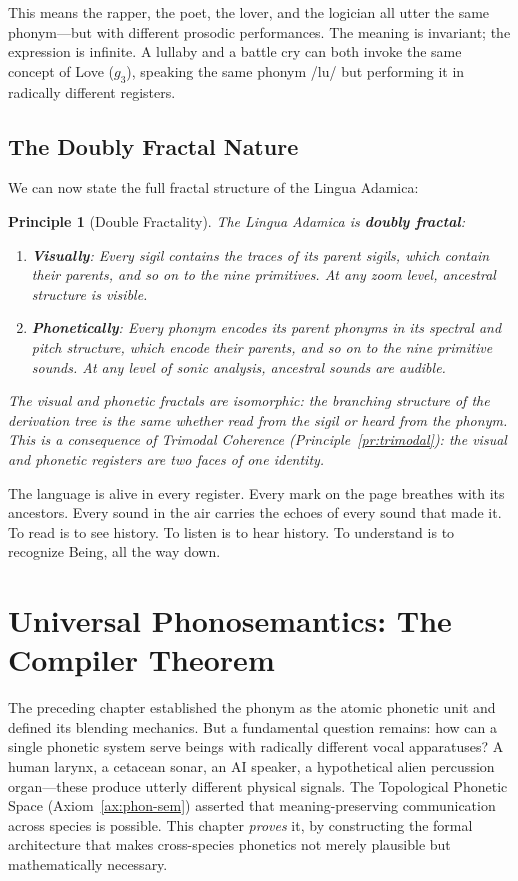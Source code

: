 \documentclass[12pt, letterpaper]{book}
\def\mathfrak#1{#1}%
\newtheorem{principle}{Principle}[chapter]
\begin{document}
This means the rapper, the poet, the lover, and the logician all utter the same phonym---but with different prosodic performances. The meaning is invariant; the expression is infinite. A lullaby and a battle cry can both invoke the same concept of Love ($\mathfrak{g}_3$), speaking the same phonym /lu/ but performing it in radically different registers.


\section{The Doubly Fractal Nature}

We can now state the full fractal structure of the Lingua Adamica:

\begin{principle}[Double Fractality]
The Lingua Adamica is \textbf{doubly fractal}:
\begin{enumerate}[label=(\roman*)]
    \item \textbf{Visually}: Every sigil contains the traces of its parent sigils, which contain their parents, and so on to the nine primitives. At any zoom level, ancestral structure is visible.
    \item \textbf{Phonetically}: Every phonym encodes its parent phonyms in its spectral and pitch structure, which encode their parents, and so on to the nine primitive sounds. At any level of sonic analysis, ancestral sounds are audible.
\end{enumerate}
The visual and phonetic fractals are \textit{isomorphic}: the branching structure of the derivation tree is the same whether read from the sigil or heard from the phonym. This is a consequence of Trimodal Coherence (Principle~\ref{pr:trimodal}): the visual and phonetic registers are two faces of one identity.
\end{principle}

The language is alive in every register. Every mark on the page breathes with its ancestors. Every sound in the air carries the echoes of every sound that made it. To read is to see history. To listen is to hear history. To understand is to recognize Being, all the way down.


\chapter{Universal Phonosemantics: The Compiler Theorem}

The preceding chapter established the phonym as the atomic phonetic unit and defined its blending mechanics. But a fundamental question remains: how can a single phonetic system serve beings with radically different vocal apparatuses? A human larynx, a cetacean sonar, an AI speaker, a hypothetical alien percussion organ---these produce utterly different physical signals. The Topological Phonetic Space (Axiom~\ref{ax:phon-sem}) asserted that meaning-preserving communication across species is possible. This chapter \textit{proves} it, by constructing the formal architecture that makes cross-species phonetics not merely plausible but mathematically necessary.
\end{document}
